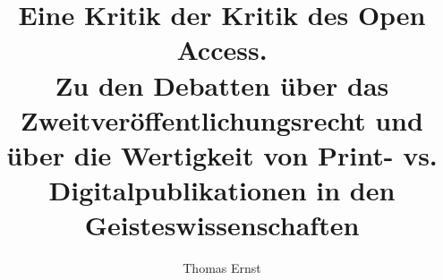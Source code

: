 
\fancyhead[R]{\thepage} %

\title{\LARGE{Eine Kritik der Kritik des Open Access. \\ Zu den Debatten über das Zweitveröffentlichungsrecht und über die Wertigkeit von Print- vs. Digitalpublikationen in den Geisteswissenschaften}} %
\author{Thomas Ernst} %

\setcounter{page}{1}